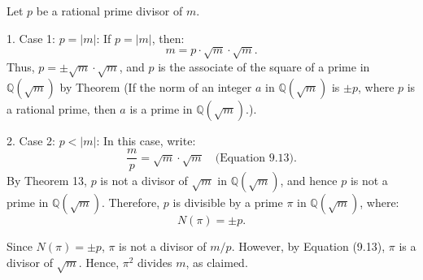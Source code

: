 \documentclass{article}
\newenvironment{proofbox}
  {\begin{mdframed}[linewidth=1pt,linecolor=black,backgroundcolor=white]\noindent\ignorespaces}
  {\end{mdframed}}
\begin{document}
\begin{proofbox}
    Let \( p \) be a rational prime divisor of \( m \).

1. Case 1: \( p = |m| \):
   If \( p = |m| \), then:
   \[
   m = p \cdot \sqrt{m} \cdot \sqrt{m}.
   \]
   Thus, \( p = \pm \sqrt{m} \cdot \sqrt{m} \), and \( p \) is the associate of the square of a prime in \( \mathbb{Q}(\sqrt{m}) \) by Theorem (If the norm of an integer \( a \) in \( \mathbb{Q}(\sqrt{m}) \) is \( \pm p \), where \( p \) is a rational prime, then \( a \) is a prime in \( \mathbb{Q}(\sqrt{m}) \).).

2. Case 2: \( p < |m| \): 
   In this case, write:
   \[
   \frac{m}{p} = \sqrt{m} \cdot \sqrt{m} \quad \text{(Equation 9.13)}.
   \]
   By Theorem 13, \( p \) is not a divisor of \( \sqrt{m} \) in \( \mathbb{Q}(\sqrt{m}) \), and hence \( p \) is not a prime in \( \mathbb{Q}(\sqrt{m}) \). Therefore, \( p \) is divisible by a prime \( \pi \) in \( \mathbb{Q}(\sqrt{m}) \), where:
   \[
   N(\pi) = \pm p.
   \]

   Since \( N(\pi) = \pm p \), \( \pi \) is not a divisor of \( m/p \). However, by Equation (9.13), \( \pi \) is a divisor of \( \sqrt{m} \). Hence, \( \pi^2 \) divides \( m \), as claimed.
\end{proofbox}
\end{document}
